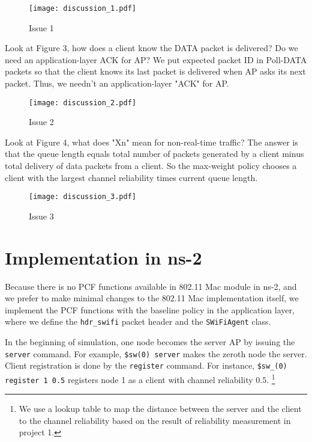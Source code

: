 \documentclass{article}
\begin{document}
\begin{figure}[H]
\centering
\texttt{[image: discussion\_1.pdf]}
\caption{Issue 1}
\end{figure}

Look at Figure 3, how does a client know the DATA packet is delivered? Do we need an application-layer ACK for AP?  We put expected packet ID in Poll-DATA packets so that the client knows its last packet is delivered when AP asks its next packet. Thus, we needn't an application-layer "ACK" for AP. 

\begin{figure}[H]
\centering
\texttt{[image: discussion\_2.pdf]}
\caption{Issue 2}
\end{figure}

Look at Figure 4, what does "Xn" mean for non-real-time traffic? The answer is that the queue length equals total number of packets generated by a client minus total delivery of data packets from a client. So the max-weight policy chooses a client with the largest channel reliability times current queue length. 

\begin{figure}[H]
\centering
\texttt{[image: discussion\_3.pdf]}
\caption{Issue 3}
\end{figure}


\section{Implementation in ns-2}
\label{section: ns2}

Because there is no PCF functions available in 802.11 Mac module in ns-2, and we
prefer to make minimal changes to the 802.11 Mac implementation itself, we
implement the PCF functions with the baseline policy in the application layer,
where we define the \lstinline|hdr_swifi| packet header and the \lstinline|SWiFiAgent| class.

In the beginning of simulation, one node becomes the server AP by issuing the
\lstinline|server| command. For example,
\lstinline|$sw(0) server| makes the zeroth node the server.
Client registration is done by the \lstinline|register|
command. For instance, \lstinline|$sw_(0) register 1 0.5|
registers node 1 as a client with channel reliability $0.5$.%
\footnote{We use a lookup table to map the distance between the server and the
client to the channel reliability based on the result of reliability measurement
in project 1.}

\newcommand\CC{C\nolinebreak[4]\hspace{-.05em}\raisebox{0.3ex}{++}}
\end{document}
